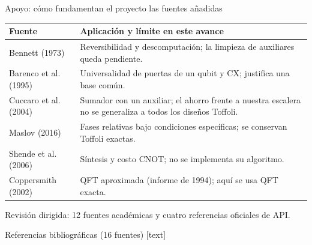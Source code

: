 \documentclass[aspectratio=169,12pt]{beamer}
\newcommand{\fuente}[1]{\vfill{\color{gris}\tiny #1\par}}
\begin{document}


\begin{frame}[shrink=0]{Apoyo: cómo fundamentan el proyecto las fuentes añadidas}
\small
\begin{tabular}{@{}p{3cm}p{10.4cm}@{}}
\toprule
Fuente & Aplicación y límite en este avance\\\midrule
Bennett (1973) & Reversibilidad y descomputación; la limpieza de auxiliares queda pendiente.\\
Barenco et al. (1995) & Universalidad de puertas de un qubit y CX; justifica una base común.\\
Cuccaro et al. (2004) & Sumador con un auxiliar; el ahorro frente a nuestra escalera no se generaliza a todos los diseños Toffoli.\\
Maslov (2016) & Fases relativas bajo condiciones específicas; se conservan Toffoli exactas.\\
Shende et al. (2006) & Síntesis y costo CNOT; no se implementa su algoritmo.\\
Coppersmith (2002) & QFT aproximada (informe de 1994); aquí se usa QFT exacta.\\
\bottomrule
\end{tabular}
\fuente{Revisión dirigida: 12 fuentes académicas y cuatro referencias oficiales de API.}
\end{frame}

\begin{frame}[allowframebreaks]{Referencias bibliográficas (16 fuentes)}
\scriptsize
{}[text]
\nocite{kaltehei2026,escanez2026,clarino2025,hajjdiab2024}
\nocite{nielsen2010,draper2000,qftdocs,statedocs,compiledocs,operatordocs}
\nocite{bennett1973,barenco1995,cuccaro2004,maslov2016,shende2006,coppersmith2002}


\end{frame}
\end{document}
